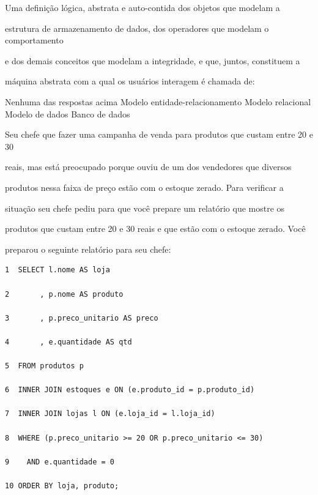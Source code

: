 \documentclass[12pt, addpoints]{exam}
\begin{document}
\begin{questions}
\question

Uma definição lógica, abstrata e auto-contida dos objetos que modelam a

estrutura de armazenamento de dados, dos operadores que modelam o comportamento

e dos demais conceitos que modelam a integridade, e que, juntos, constituem a

máquina abstrata com a qual os usuários interagem é chamada de:


\begin{choices}
\choice Nenhuma das respostas acima
\choice Modelo entidade-relacionamento
\choice Modelo relacional
\choice Modelo de dados
\choice Banco de dados
\end{choices}

\question

Seu chefe que fazer uma campanha de venda para produtos que custam entre 20 e 30

reais, mas está preocupado porque ouviu de um dos vendedores que diversos

produtos nessa faixa de preço estão com o estoque zerado. Para verificar a

situação seu chefe pediu para que você prepare um relatório que mostre os

produtos que custam entre 20 e 30 reais e que estão com o estoque zerado. Você

preparou o seguinte relatório para seu chefe:

\begin{tcolorbox}

 \begin{verbatim}1  SELECT l.nome AS loja

2       , p.nome AS produto

3       , p.preco_unitario AS preco

4       , e.quantidade AS qtd

5  FROM produtos p

6  INNER JOIN estoques e ON (e.produto_id = p.produto_id)

7  INNER JOIN lojas l ON (e.loja_id = l.loja_id)

8  WHERE (p.preco_unitario >= 20 OR p.preco_unitario <= 30)

9    AND e.quantidade = 0

10 ORDER BY loja, produto;

 \end{verbatim}

\end{tcolorbox}


\end{questions}
\end{document}
